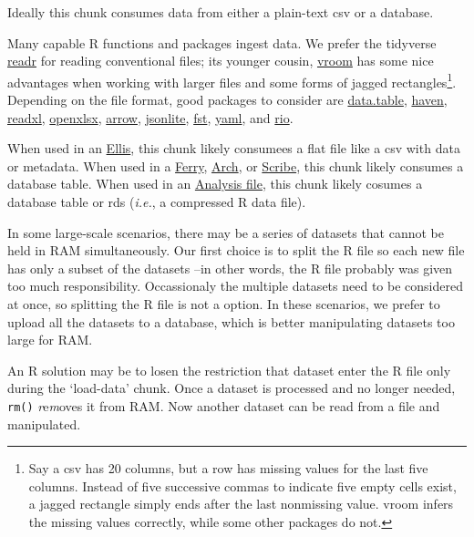 \documentclass[
]{book}
\begin{document}
Ideally this chunk consumes data from either a plain-text csv or a database.

Many capable R functions and packages ingest data. We prefer the tidyverse \href{https://readr.tidyverse.org/}{readr} for reading conventional files; its younger cousin, \href{https://vroom.r-lib.org/}{vroom} has some nice advantages when working with larger files and some forms of jagged rectangles\footnote{Say a csv has 20 columns, but a row has missing values for the last five columns. Instead of five successive commas to indicate five empty cells exist, a jagged rectangle simply ends after the last nonmissing value. vroom infers the missing values correctly, while some other packages do not.}. Depending on the file format, good packages to consider are \href{https://cran.r-project.org/package=data.table}{data.table}, \href{https://haven.tidyverse.org/}{haven}, \href{https://readxl.tidyverse.org/}{readxl}, \href{https://ycphs.github.io/openxlsx/}{openxlsx}, \href{https://CRAN.R-project.org/package=arrow}{arrow}, \href{https://CRAN.R-project.org/package=jsonlite}{jsonlite}, \href{http://www.fstpackage.org/}{fst}, \href{https://CRAN.R-project.org/package=yaml}{yaml}, and \href{https://cloud.r-project.org/web/packages/rio/vignettes/rio.html}{rio}.

When used in an \protect\hyperlink{pattern-ellis}{Ellis}, this chunk likely consumees a flat file like a csv with data or metadata. When used in a \protect\hyperlink{pattern-ferry}{Ferry}, \protect\hyperlink{pattern-arch}{Arch}, or \protect\hyperlink{pattern-scribe}{Scribe}, this chunk likely consumes a database table. When used in an \protect\hyperlink{pattern-analysis}{Analysis file}, this chunk likely cosumes a database table or rds (\emph{i.e.}, a compressed R data file).

In some large-scale scenarios, there may be a series of datasets that cannot be held in RAM simultaneously. Our first choice is to split the R file so each new file has only a subset of the datasets --in other words, the R file probably was given too much responsibility. Occassionaly the multiple datasets need to be considered at once, so splitting the R file is not a option. In these scenarios, we prefer to upload all the datasets to a database, which is better manipulating datasets too large for RAM.

An R solution may be to losen the restriction that dataset enter the R file only during the `load-data' chunk. Once a dataset is processed and no longer needed, \texttt{rm()} \emph{r}e\emph{m}oves it from RAM. Now another dataset can be read from a file and manipulated.
\end{document}
